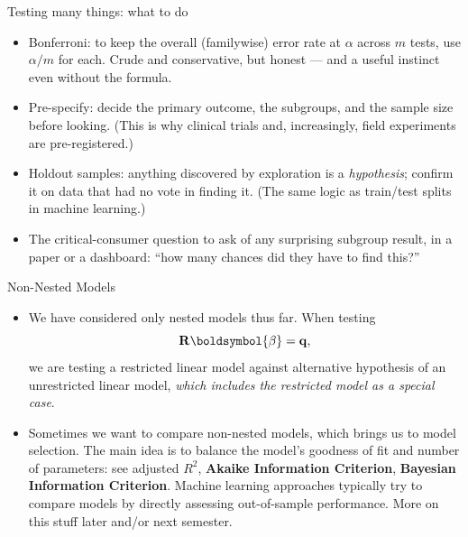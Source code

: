 \documentclass[aspectratio=169,11pt]{beamer}
\begin{document}
\begin{frame}{Testing many things: what to do}
\begin{itemize}
	\item \alert{Bonferroni}: to keep the overall (familywise) error rate at
	$\alpha$ across $m$ tests, use $\alpha/m$ for each. Crude and conservative, but
	honest --- and a useful instinct even without the formula.

	\item \alert{Pre-specify}: decide the primary outcome, the subgroups, and the
	sample size before looking. (This is why clinical trials and, increasingly, field
	experiments are pre-registered.)

	\item \alert{Holdout samples}: anything discovered by exploration is a
	\emph{hypothesis}; confirm it on data that had no vote in finding it. (The same
	logic as train/test splits in machine learning.)

	\item The critical-consumer question to ask of any surprising subgroup result,
	in a paper or a dashboard: \alert{``how many chances did they have to find
	this?''}
\end{itemize}
\end{frame}


\begin{frame}{Non-Nested Models}
\begin{itemize}
	\item We have considered only nested models thus far. When testing \[
	{\bf R} \boldsymbol{\beta} = {\bf q}, 
	\]
	we are testing a restricted linear model against alternative hypothesis of 
	an unrestricted linear model, \emph{ which includes the restricted model as a special
	case}.

	\medskip
	\item Sometimes we want to compare non-nested models, which brings us to
	model selection. The main idea
	is to balance the model's goodness of fit and number of parameters: see
	adjusted $R^2$, {\bf Akaike Information Criterion}, {\bf Bayesian
	Information Criterion}. Machine learning approaches typically
	try to compare models by directly assessing out-of-sample performance.
	 More on this stuff later and/or next semester.

\end{itemize}
\end{frame}
\end{document}
